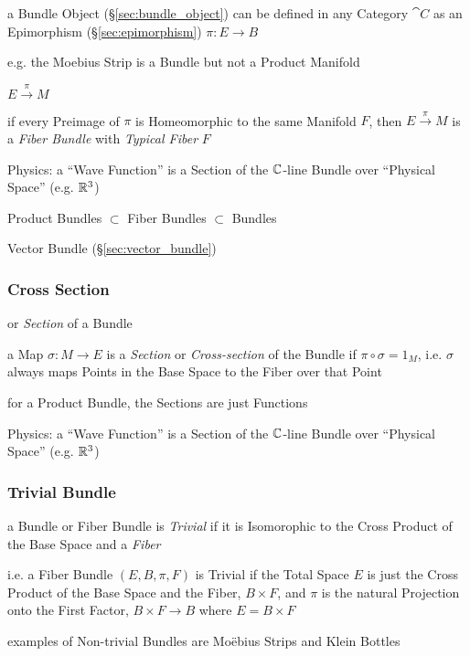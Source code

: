 a Bundle Object (\S\ref{sec:bundle_object}) can be defined in any Category
$\cat{C}$ as an Epimorphism (\S\ref{sec:epimorphism}) $\pi : E \to B$

e.g. the Moebius Strip is a Bundle but not a Product Manifold

$E \xrightarrow{\pi} M$

if every Preimage of $\pi$ is Homeomorphic to the same Manifold $F$, then $E
\xrightarrow{\pi} M$ is a \emph{Fiber Bundle} with \emph{Typical Fiber} $F$

Physics: a ``Wave Function'' is a Section of the $\mathbb{C}$-line Bundle over
``Physical Space'' (e.g. $\mathbb{R}^3$)

Product Bundles $\subset$ Fiber Bundles $\subset$ Bundles

Vector Bundle (\S\ref{sec:vector_bundle})




\subsubsection{Cross Section}\label{sec:cross_section}

or \emph{Section} of a Bundle

a Map $\sigma : M \to E$ is a \emph{Section} or \emph{Cross-section} of
the Bundle if $\pi \circ \sigma = 1_M$, i.e. $\sigma$ always maps Points in the
Base Space to the Fiber over that Point

for a Product Bundle, the Sections are just Functions

Physics: a ``Wave Function'' is a Section of the $\mathbb{C}$-line Bundle over
``Physical Space'' (e.g. $\mathbb{R}^3$)



\subsubsection{Trivial Bundle}\label{sec:trivial_bundle}

a Bundle or Fiber Bundle is \emph{Trivial} if it is Isomorophic to the Cross
Product of the Base Space and a \emph{Fiber}

i.e. a Fiber Bundle $(E, B, \pi, F)$ is Trivial if the Total Space $E$ is just
the Cross Product of the Base Space and the Fiber, $B \times F$, and $\pi$ is
the natural Projection onto the First Factor, $B \times F \to B$ where
$E = B \times F$

examples of Non-trivial Bundles are Mo\"ebius Strips and Klein Bottles



